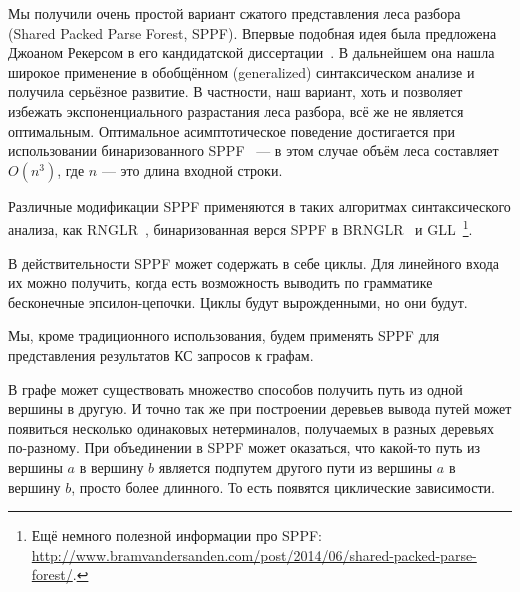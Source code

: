 \begin{example}
\begin{center}
{
}
\end{center}


\end{example}


Мы получили очень простой вариант сжатого представления леса разбора (Shared Packed Parse Forest, SPPF).
Впервые подобная идея была предложена Джоаном Рекерсом в его кандидатской диссертации~\cite{SPPF}.
В дальнейшем она нашла широкое применение в обобщённом (generalized) синтаксическом анализе и получила серьёзное развитие.
В частности, наш вариант, хоть и позволяет избежать экспоненциального разрастания леса разбора, всё же не является оптимальным.
Оптимальное асимптотическое поведение достигается при использовании бинаризованного SPPF~\cite{Billot:1989:SSF:981623.981641} --- в этом случае объём леса составляет $O(n^3)$, где $n$ --- это длина входной строки.

Различные модификации SPPF применяются в таких алгоритмах синтаксического анализа, как RNGLR~\cite{Scott:2006:RNG:1146809.1146810}, бинаризованная верся SPPF в BRNGLR~\cite{Scott:2007:BCT:1289813.1289815} и GLL~\cite{Scott:2010:GP:1860132.1860320,10.1007/978-3-662-46663-6_5}\footnote{Ещё немного полезной информации про SPPF: \url{http://www.bramvandersanden.com/post/2014/06/shared-packed-parse-forest/}.}.

В действительности SPPF может содержать в себе циклы. Для линейного входа их можно получить, когда есть возможность выводить по грамматике бесконечные эпсилон-цепочки. Циклы будут вырожденными, но они будут.

Мы, кроме традиционного использования, будем применять SPPF для представления результатов КС запросов к графам.

В графе может существовать множество способов получить путь из одной вершины в другую. И точно так же при построении деревьев вывода путей может появиться несколько одинаковых нетерминалов, получаемых в разных деревьях по-разному. При объединении в SPPF может оказаться, что какой-то путь из вершины $a$ в вершину $b$ является подпутем другого пути из вершины $a$ в вершину $b$, просто более длинного. То есть появятся циклические зависимости.

